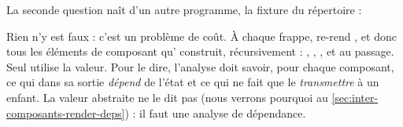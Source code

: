La seconde question naît d'un autre programme, la fixture  du répertoire
 :


Rien n'y est faux : c'est un problème de coût. À chaque frappe,  re-rend
, et donc tous les éléments de composant qu' construit, récursivement :
, , , et  au passage. Seul 
utilise la valeur. Pour le dire, l'analyse doit savoir, pour chaque composant, ce qui dans sa
sortie \emph{dépend} de l'état et ce qui ne fait que le \emph{transmettre} à un enfant. La
valeur abstraite ne le dit pas (nous verrons pourquoi au \cref{sec:inter-composants-render-deps}) :
il faut une analyse de dépendance.

